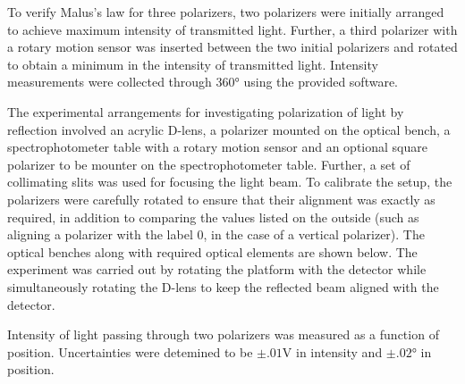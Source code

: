 \begin{paper}
	To verify Malus's law for three polarizers, two polarizers were initially arranged to achieve maximum intensity of transmitted light. Further, a third polarizer with a rotary motion sensor was inserted between the two initial polarizers and rotated to obtain a minimum in the intensity of transmitted light. Intensity measurements were collected through \( 360 \si{\degree} \) using the provided software.
	
	The experimental arrangements for investigating polarization of light by reflection involved an acrylic D-lens, a polarizer mounted on the optical bench, a spectrophotometer table with a rotary motion sensor and an optional square polarizer to be mounter on the spectrophotometer table. Further, a set of collimating slits was used for focusing the light beam. To calibrate the setup, the polarizers were carefully rotated to ensure that their alignment was exactly as required, in addition to comparing the values listed on the outside (such as aligning a polarizer with the label 0, in the case of a vertical polarizer). The optical benches along with required optical elements are shown below. The experiment was carried out by rotating the platform with the detector while simultaneously rotating the D-lens to keep the reflected beam aligned with the detector.
	
	
	Intensity of light passing through two polarizers was measured as a function of position. Uncertainties were detemined to be \( \pm .01 \si{\volt} \) in intensity and \( \pm .02\si{\degree}\) in position.
	
	\pagebreak
		

\end{paper}
